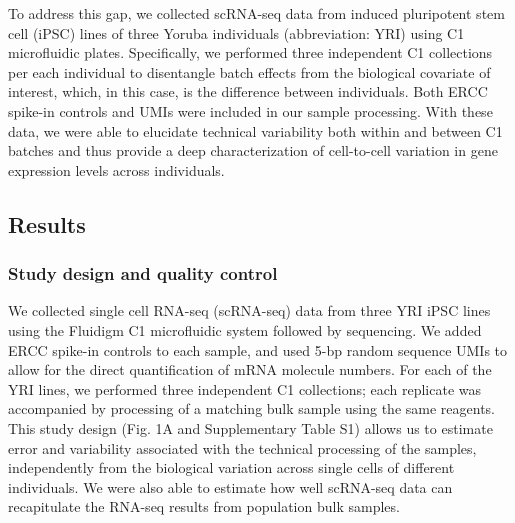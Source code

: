 To address this gap, we collected scRNA-seq data from induced
pluripotent stem cell (iPSC) lines of three Yoruba individuals
(abbreviation: YRI) using C1 microfluidic plates. Specifically, we
performed three independent C1 collections per each individual to
disentangle batch effects from the biological covariate of interest,
which, in this case, is the difference between individuals. Both ERCC
spike-in controls and UMIs were included in our sample processing. With
these data, we were able to elucidate technical variability both within
and between C1 batches and thus provide a deep characterization of
cell-to-cell variation in gene expression levels across individuals.

\subsection{Results}\label{results}

\subsubsection{Study design and quality
control}\label{study-design-and-quality-control}

We collected single cell RNA-seq (scRNA-seq) data from three YRI iPSC
lines using the Fluidigm C1 microfluidic system followed by sequencing.
We added ERCC spike-in controls to each sample, and used 5-bp random
sequence UMIs to allow for the direct quantification of mRNA molecule
numbers. For each of the YRI lines, we performed three independent C1
collections; each replicate was accompanied by processing of a matching
bulk sample using the same reagents. This study design (Fig. 1A and
Supplementary Table S1) allows us to estimate error and variability
associated with the technical processing of the samples, independently
from the biological variation across single cells of different
individuals. We were also able to estimate how well scRNA-seq data can
recapitulate the RNA-seq results from population bulk samples.

